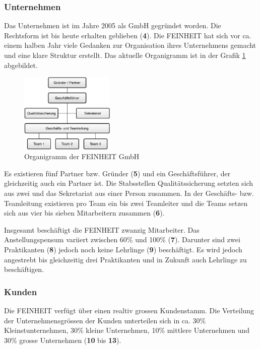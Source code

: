 \subsubsection{Unternehmen}
Das Unternehmen ist im Jahre 2005 als GmbH gegründet worden. Die Rechtsform
ist bis heute erhalten geblieben (\textbf{4}). Die FEINHEIT hat sich vor ca. 
einem halben Jahr viele Gedanken zur Organisation ihres Unternehmens gemacht 
und eine klare Struktur erstellt. Das aktuelle Organigramm ist in der Grafik 
\ref{pic:organigramm_feinheit} abgebildet.

\begin{figure}[htbp]
\begin{center}
\includegraphics[width=0.4\textwidth,angle=0]{./bilder/analyse/organigramm_feinheit.pdf}
\caption[Organigramm der FEINHEIT GmbH]{Organigramm der FEINHEIT GmbH\footnotemark}
\label{pic:organigramm_feinheit}
\end{center}
\end{figure}

Es existieren fünf Partner bzw. Gründer (\textbf{5}) und ein Geschäftsführer,
der gleichzeitig auch ein Partner ist. Die Stabsstellen Qualitätssicherung setzten
sich aus zwei und das Sekretariat aus einer Person zusammen. In der Geschäfts-
bzw. Teamleitung existieren pro Team ein bis zwei Teamleiter und die Teams
setzen sich aus vier bis sieben Mitarbeitern zusammen (\textbf{6}).

Insgesamt beschäftigt die FEINHEIT zwanzig Mitarbeiter. Das Anstellungspensum
variiert zwischen 60\% und 100\% (\textbf{7}). Darunter sind zwei Praktikanten (\textbf{8})
jedoch noch keine Lehrlinge (\textbf{9}) beschäftigt. Es wird jedoch angestrebt
bis gleichzeitig drei Praktikanten und in Zukunft auch Lehrlinge zu beschäftigen.

\subsubsection{Kunden}
Die FEINHEIT verfügt über einen realtiv grossen Kundenstamm. Die Verteilung der
Unternehmensgrössen der Kunden unterteilen sich in ca. 30\% Kleinstunternehmen,
30\% kleine Unternehmen, 10\% mittlere Unternehmen und 30\% grosse Unternehmen 
(\textbf{10} bis \textbf{13}).

